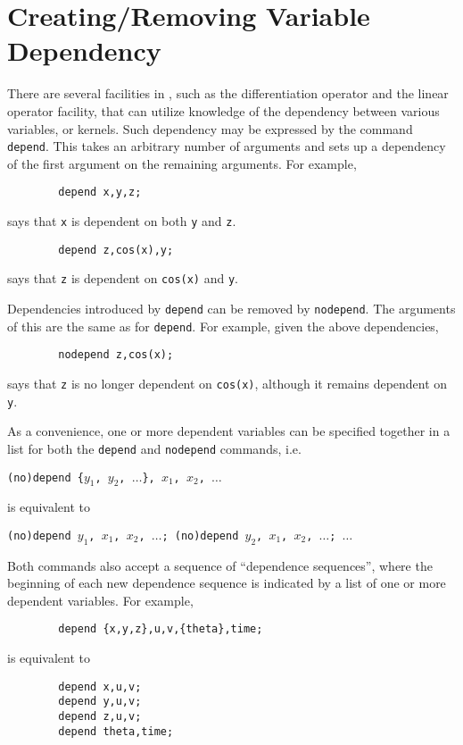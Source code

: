 \section{Creating/Removing Variable Dependency}
\hypertarget{command:DEPEND}{}
\hypertarget{command:NODEPEND}{}

There are several facilities in {\REDUCE}, such as the differentiation
operator and the linear operator facility, that
can utilize knowledge of the dependency between various variables, or
kernels.  Such dependency may be expressed by the command \texttt{depend}.
This takes an arbitrary number of arguments and
sets up a dependency of the first argument on the remaining arguments.
For example,
\begin{verbatim}
        depend x,y,z;
\end{verbatim}
says that \texttt{x} is dependent on both \texttt{y} and \texttt{z}.
\begin{verbatim}
        depend z,cos(x),y;
\end{verbatim}
says that \texttt{z} is dependent on \texttt{cos(x)} and \texttt{y}.

Dependencies introduced by \texttt{depend} can be removed by \texttt{nodepend}.
 The arguments of this are the same as for \texttt{depend}.
For example, given the above dependencies,
\begin{verbatim}
        nodepend z,cos(x);
\end{verbatim}
says that \texttt{z} is no longer dependent on \texttt{cos(x)}, although it remains
dependent on \texttt{y}.

As a convenience, one or more dependent variables can be specified
together in a list for both the \texttt{depend} and \texttt{nodepend}
commands, i.e.

\texttt{(no)depend \{$y_1$, $y_2$, $\ldots$\}, $x_1$, $x_2$, $\ldots$}

is equivalent to

\texttt{(no)depend $y_1$, $x_1$, $x_2$, $\ldots$; (no)depend $y_2$, $x_1$, $x_2$, $\ldots$; $\ldots$}

Both commands also accept a sequence of ``dependence sequences'',
where the beginning of each new dependence sequence is indicated by a
list of one or more dependent variables.  For example,
\begin{verbatim}
        depend {x,y,z},u,v,{theta},time;
\end{verbatim}
is equivalent to
\begin{verbatim}
        depend x,u,v;
        depend y,u,v;
        depend z,u,v;
        depend theta,time;
\end{verbatim}
